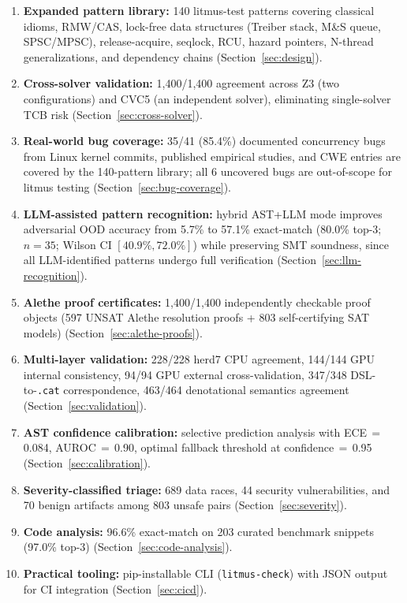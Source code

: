\documentclass[11pt]{article}
\begin{document}
\begin{enumerate}[nosep]
\item \textbf{Expanded pattern library:} 140 litmus-test patterns covering
  classical idioms, RMW/CAS, lock-free data structures (Treiber stack,
  M\&S queue, SPSC/MPSC), release-acquire, seqlock, RCU, hazard pointers,
  N-thread generalizations, and dependency chains
  (Section~\ref{sec:design}).
\item \textbf{Cross-solver validation:} 1{,}400/1{,}400 agreement across
  Z3 (two configurations) and CVC5 (an independent solver),
  eliminating single-solver TCB risk
  (Section~\ref{sec:cross-solver}).
\item \textbf{Real-world bug coverage:} 35/41 (85.4\%) documented
  concurrency bugs from Linux kernel commits, published empirical
  studies, and CWE entries are covered by the 140-pattern library;
  all 6 uncovered bugs are out-of-scope for litmus testing
  (Section~\ref{sec:bug-coverage}).
\item \textbf{LLM-assisted pattern recognition:} hybrid AST+LLM mode
  improves adversarial OOD accuracy from 5.7\% to 57.1\% exact-match
  (80.0\% top-3; $n=35$; Wilson CI $[40.9\%, 72.0\%]$) while preserving
  SMT soundness, since all LLM-identified patterns undergo full
  verification (Section~\ref{sec:llm-recognition}).
\item \textbf{Alethe proof certificates:} 1{,}400/1{,}400 independently
  checkable proof objects (597 UNSAT Alethe resolution proofs +
  803 self-certifying SAT models)
  (Section~\ref{sec:alethe-proofs}).
\item \textbf{Multi-layer validation:} 228/228 herd7 CPU agreement,
  144/144 GPU internal consistency, 94/94 GPU external cross-validation,
  347/348 DSL-to-\texttt{.cat} correspondence, 463/464 denotational
  semantics agreement (Section~\ref{sec:validation}).
\item \textbf{AST confidence calibration:} selective prediction analysis
  with ECE\,$=$\,0.084, AUROC\,$=$\,0.90, optimal fallback threshold
  at confidence\,$=$\,0.95 (Section~\ref{sec:calibration}).
\item \textbf{Severity-classified triage:} 689 data races, 44
  security vulnerabilities, and 70 benign artifacts among 803
  unsafe pairs (Section~\ref{sec:severity}).
\item \textbf{Code analysis:} 96.6\% exact-match on 203 curated
  benchmark snippets (97.0\% top-3)
  (Section~\ref{sec:code-analysis}).
\item \textbf{Practical tooling:} pip-installable CLI
  (\texttt{litmus-check}) with JSON output for CI integration
  (Section~\ref{sec:cicd}).
\end{enumerate}
\end{document}
